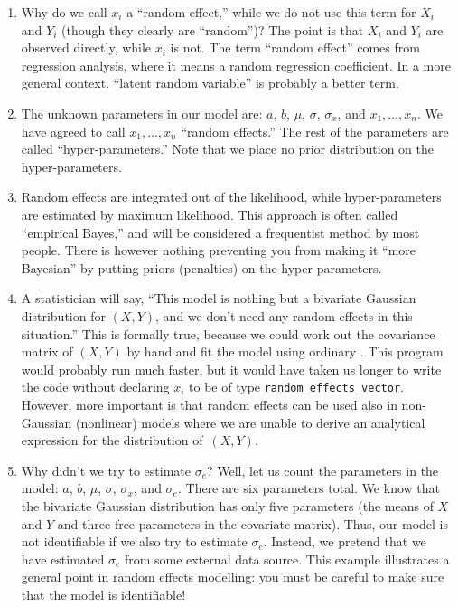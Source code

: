 \documentclass{admbmanual}
\begin{document}
\begin{enumerate}
  \item Why do we call $x_i$ a ``random effect,'' while we do not use this term
  for $X_i$ and $Y_i$ (though they clearly are ``random'')? The point is that
  $X_i$ and $Y_i$ are observed directly, while $x_i$ is not. The term ``random
  effect'' comes from regression analysis, where it means a random regression
  coefficient. In a more general context. ``latent random variable'' is probably
  a better term.

  \item The unknown parameters in our model are: $a$, $b$, $\mu$, $\sigma$,
  $\sigma_{x}$, and $x_{1},\ldots ,x_{n}$. We have agreed to call
  $x_{1},\ldots,x_{n}$ ``random effects.'' The rest of the parameters are called
  ``hyper-parameters.'' Note that we place no prior distribution on the
  hyper-parameters.

  \item Random effects are integrated out of the likelihood, while
  hyper-parameters are estimated by maximum likelihood. 
  This approach is often called ``empirical Bayes,'' and will be considered a
  frequentist method by most people. There is however nothing preventing you
  from making it ``more Bayesian'' by putting priors (penalties) on the
  hyper-parameters.

  \item A statistician will say, ``This model is nothing but a bivariate
  Gaussian distribution for $(X,Y)$, and we don't need any random effects in
  this situation.'' This is formally true, because we could work out the
  covariance matrix of $(X,Y)$ by hand and fit the model using ordinary \scAB.
  This program would probably run much faster, but it would have taken us longer
  to write the code without declaring $x_i$ to be of type
  \texttt{random\_effects\_vector}. However, more important is that random
  effects can be used also in non-Gaussian (nonlinear) models where we are
  unable to derive an analytical expression for the distribution of~$(X,Y)$.

  \item Why didn't we try to estimate $\sigma_{e}$? Well, let us count the
  parameters in the model: $a$, $b$, $\mu$, $\sigma$, $\sigma_{x}$, and
  $\sigma_{e}$. There are six parameters total. We know that the bivariate
  Gaussian distribution has only five parameters (the means of $X$ and $Y$ and
  three free parameters in the covariate matrix). Thus, our model is not
  identifiable if we also try to estimate $\sigma_{e}$. Instead, we pretend that
  we have estimated $\sigma_{e}$ from some external data source. This example
  illustrates a general point in random effects modelling: you must be careful
  to make sure that the model is identifiable!
\end{enumerate}
\end{document}
